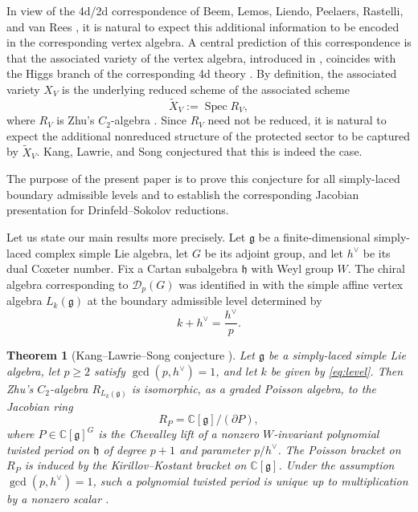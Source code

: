 \documentclass[11pt,reqno]{amsart}
\newtheorem{theorem}{Theorem}
\theoremstyle{remark}
\newcommand{\g}{\mathfrak g}
\newcommand{\h}{\mathfrak h}
\newcommand{\C}{\mathbb C}
\begin{document}
In view of the 4d/2d correspondence of Beem, Lemos, Liendo, Peelaers,
Rastelli, and van Rees \cite{BLLPRvR}, it is natural to expect this
additional information to be encoded in the corresponding vertex
algebra. A central prediction of this correspondence is that the
associated variety of the vertex algebra, introduced in \cite{Ara},
coincides with the Higgs branch of the corresponding 4d theory
\cite{BR}. By definition, the associated variety $X_V$ is the
underlying reduced scheme of the associated scheme
\[
\widetilde{X}_V:=\operatorname{Spec}R_V,
\]
where $R_V$ is Zhu's $C_2$-algebra \cite{Zhu}. Since $R_V$ need not
be reduced, it is natural to expect the additional nonreduced
structure of the protected sector to be captured by
$\widetilde{X}_V$. Kang, Lawrie, and Song \cite{KLS} conjectured that
this is indeed the case.

The purpose of the present paper is to prove this conjecture for all
simply-laced boundary admissible levels and to establish the
corresponding Jacobian presentation for Drinfeld--Sokolov reductions.

Let us state our main results more precisely. Let $\g$ be a
finite-dimensional simply-laced complex simple Lie algebra, let $G$
be its adjoint group, and let $h^\vee$ be its dual Coxeter number.
Fix a Cartan subalgebra $\h$ with Weyl group $W$. The chiral algebra
corresponding to $\mathcal D_p(G)$ was identified in \cite{SXY} with
the simple affine vertex algebra $L_k(\mathfrak g)$ at the boundary
admissible level \cite{KW1,KW2} determined by
\begin{equation}\label{eq:level}
k+h^\vee=\frac{h^\vee}{p}.
\end{equation}

\begin{theorem}[Kang--Lawrie--Song conjecture \cite{KLS}]
\label{th:main1}
Let $\mathfrak g$ be a simply-laced simple Lie algebra, let $p\geq2$
satisfy $\gcd(p,h^\vee)=1$, and let $k$ be given by
\eqref{eq:level}. Then Zhu's $C_2$-algebra
$R_{L_k(\mathfrak g)}$ is isomorphic, as a graded Poisson algebra, to
the Jacobian ring
\[
R_P=\mathbb C[\mathfrak g]/(\partial P),
\]
where $P\in\C[\g]^G$ is the Chevalley lift of a nonzero $W$-invariant
polynomial twisted period on $\h$ of degree $p+1$ and parameter
$p/h^\vee$. The Poisson bracket on $R_P$ is induced by the
Kirillov--Kostant bracket on $\C[\g]$. Under the assumption
$\gcd(p,h^\vee)=1$, such a polynomial twisted period is unique up to
multiplication by a nonzero scalar \cite{FS}.
\end{theorem}
\end{document}
